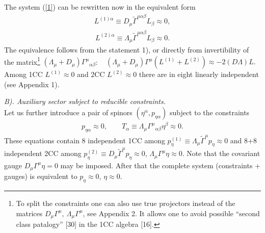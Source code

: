 \documentclass[a4paper]{article}
\begin{document}
The system (\ref{1}) can be rewritten now in the equivalent form
\begin{eqnarray}\label{8}
L^{(1)\alpha}\equiv D_\mu\tilde\Gamma^{\mu\alpha\beta}L_\beta
\approx 0,
\end{eqnarray}
\begin{eqnarray}\label{9}
L^{(2)\alpha}\equiv \Lambda_\mu\tilde\Gamma^{\mu\alpha\beta}L_\beta
\approx 0.
\end{eqnarray}
The equivalence follows from the statement 1), or directly from 
invertibility of the matrix\footnote{To split the constraints one can 
also use true projectors instead of the matrices $D_\mu\Gamma^\mu, ~ 
\Lambda_\mu\Gamma^\mu$, see Appendix 2. It allows one to avoid possible 
``second class patalogy'' [30] in the 1CC algebra [16].}
$(\Lambda_\mu+D_\mu){\Gamma^\mu}_{\alpha\beta}$: ~
$(\Lambda_\mu+D_\mu){\Gamma^\mu}(L^{(1)}+L^{(2)})\approx -2(D\Lambda)L.$
Among 1CC $L^{(1)}\approx0$ and 2CC $L^{(2)}\approx0$ there are in
eight linearly independent (see Appendix 1).

{\em B). Auxiliary sector subject to reducible constraints.} \\ 
Let us further introduce a pair of spinors
$(\eta^\alpha,p_{\eta\alpha})$ subject to the constraints
\begin{eqnarray}\label{10}
p_{\eta\alpha}\approx0, \qquad T_\alpha\equiv \Lambda_\mu
{\Gamma^\mu}_{\alpha\beta}\eta^\beta\approx0.
\end{eqnarray}
These equations contain 8 independent 1CC among $p^{(1)}_\eta\equiv
\Lambda_\mu\tilde\Gamma^\mu p_\eta\approx0$ and 8+8 independent 2CC
among $p^{(2)}_\eta\equiv D_\mu\tilde\Gamma^\mu p_\eta\approx0$,
$\Lambda_\mu\Gamma^\mu\eta\approx0$. Note that the covariant gauge
$D_\mu\Gamma^\mu\eta=0$ may be imposed. After that the complete system
(constraints + gauges) is equivalent to $p_\eta\approx0$,
$\eta\approx0$.
\end{document}

